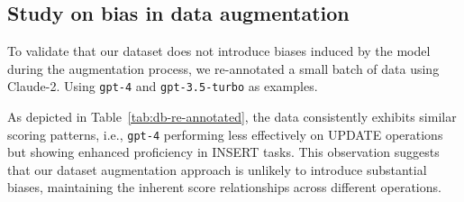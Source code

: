 
\subsection{Study on bias in data augmentation}

To validate that our dataset does not introduce biases induced by the model during the augmentation process, we re-annotated a small batch of data using Claude-2. Using \texttt{gpt-4} and \texttt{gpt-3.5-turbo} as examples.

As depicted in Table~\ref{tab:db-re-annotated}, the data consistently exhibits similar scoring patterns, i.e., \texttt{gpt-4} performing less effectively on UPDATE operations but showing enhanced proficiency in INSERT tasks. This observation suggests that our dataset augmentation approach is unlikely to introduce substantial biases, maintaining the inherent score relationships across different operations.

